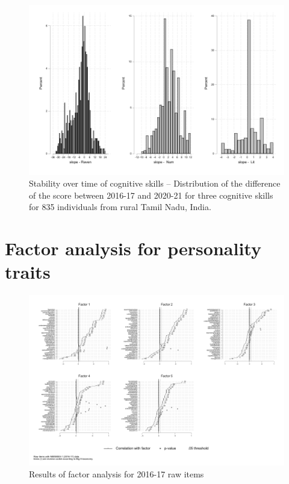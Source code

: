 \documentclass[a4paper, 12pt, onecolumn]{article}
\begin{document}
\begin{figure}[!htb]
\raggedright
\includegraphics[scale=0.86]{INPUT/diffcont_cog}
\caption{Stability over time of cognitive skills -- Distribution of the difference of the score between 2016-17 and 2020-21 for three cognitive skills for 835 individuals from rural Tamil Nadu, India.}
\label{fig:stabcog}
\end{figure}







\clearpage
\newpage
\appendix
{}




\clearpage
\newpage
\section{Factor analysis for personality traits}
\label{section:efa_big5}



\clearpage
\begin{figure}[!htb]
\raggedright
\includegraphics[width=\textwidth, angle=0]{INPUT/factor2016_2}
\caption{Results of factor analysis for 2016-17 raw items}
\label{fig:resefa}
\end{figure}
\end{document}
